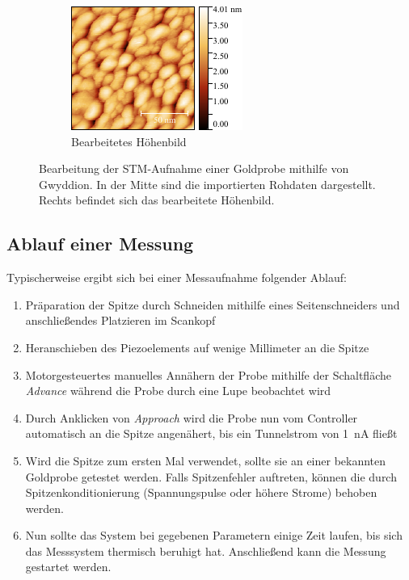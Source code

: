 \documentclass[a4paper,twoside,final]{article}
\begin{document}
\begin{figure}[htp]
\begin{subfigure}{0.3\textwidth}
        \includegraphics[width=\textwidth]{Bilder/Image01963_bearbeitet.pdf}
        \caption{Bearbeitetes Höhenbild}
    \end{subfigure}
    \caption{Bearbeitung der STM-Aufnahme einer Goldprobe mithilfe von Gwyddion. In der Mitte sind die importierten Rohdaten dargestellt. Rechts befindet sich das bearbeitete Höhenbild.}
    \label{fig:Bildbearbeitung}
\end{figure}
\subsection{Ablauf einer Messung}
Typischerweise ergibt sich bei einer Messaufnahme folgender Ablauf:
\begin{enumerate}
  \item Präparation der Spitze durch Schneiden mithilfe eines Seitenschneiders und anschließendes Platzieren im Scankopf
  \item Heranschieben des Piezoelements auf wenige Millimeter an die Spitze
  \item Motorgesteuertes manuelles Annähern der Probe mithilfe der Schaltfläche \textit{Advance} während die Probe durch eine Lupe beobachtet wird
  \item Durch Anklicken von \textit{Approach} wird die Probe nun vom Controller automatisch an die Spitze angenähert, bis ein Tunnelstrom von \SI{1}{\nano\ampere} fließt
  \item Wird die Spitze zum ersten Mal verwendet, sollte sie an einer bekannten Goldprobe getestet werden. Falls Spitzenfehler auftreten, können die durch Spitzenkonditionierung (Spannungspulse oder höhere Strome) behoben werden.
  \item Nun sollte das System bei gegebenen Parametern einige Zeit laufen, bis sich das Messsystem thermisch beruhigt hat. Anschließend kann die Messung gestartet werden.
\end{enumerate}
\newpage
\end{document}
